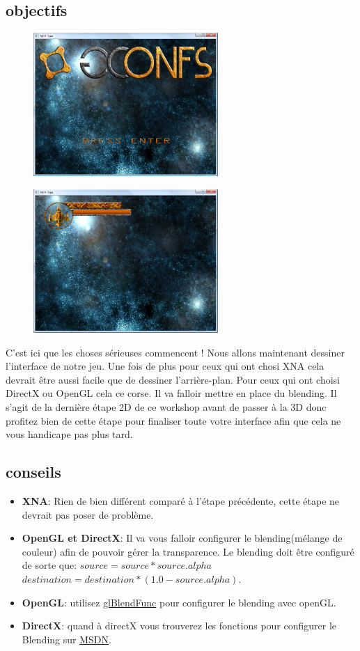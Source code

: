 \documentclass[12pt,a4paper]{report}
\begin{document}
\subsection{objectifs}
\begin{figure}[!h]\centering\includegraphics[width=7cm]{menu_window.png}\end{figure}
\begin{figure}[!h]\centering\includegraphics[width=7cm]{interface_window.png}\end{figure}
C'est ici que les choses sérieuses commencent ! Nous allons maintenant dessiner l'interface de notre jeu.
Une fois de plus pour ceux qui ont chosi XNA cela devrait être aussi facile que de dessiner l'arrière-plan.
Pour ceux qui ont choisi DirectX ou OpenGL cela ce corse. Il va falloir mettre en place du blending. Il s'agit de la
dernière étape 2D de ce workshop avant de passer à la 3D donc profitez bien de
cette étape pour finaliser toute votre interface afin que cela ne vous handicape pas plus tard.

\subsection{conseils}
\begin{itemize}
\item \textbf{XNA}: Rien de bien différent comparé à l'étape précédente, cette étape ne devrait pas poser de problème.
\item \textbf{OpenGL et DirectX}: Il va vous falloir configurer le blending(mélange de couleur) afin de pouvoir gérer la transparence. Le blending
doit être configuré de sorte que: $source = source * source.alpha$ $destination = destination * (1.0 - source.alpha)$.
\item \textbf{OpenGL}: utilisez \href{http://nehe.gamedev.net/tutorial/blending/16001/}{glBlendFunc} pour configurer le blending avec openGL.
\item \textbf{DirectX}: quand à directX vous trouverez les fonctions pour configurer le Blending sur \href{http://msdn.microsoft.com/en-us/library/windows/desktop/bb206241(v=vs.85).aspx}{MSDN}.
\end{itemize}
\newpage
\end{document}
